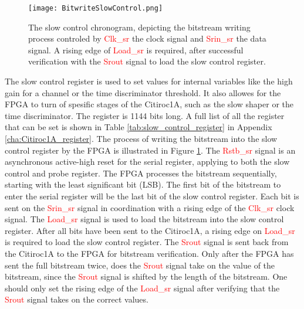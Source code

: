 \begin{figure}
    \centering
    \texttt{[image: BitwriteSlowControl.png]}
    \caption{The slow control chronogram, depicting the bitstream writing process controled by  \textcolor{red}{Clk\_sr} the clock signal and  \textcolor{red}{Srin\_sr} the data signal. A rising edge of \textcolor{red}{Load\_sr} is required,
     after successful verification with the \textcolor{red}{Srout} signal to load the slow control register.\autocite{datasheetCITIROC}}
    \label{fig:CITIROC1A_writing_bitstream}
\end{figure}
The slow control register is used to set values for internal variables like the high gain for a channel or the time discriminator threshold.
It also allowes for the FPGA to turn of spesific stages of the Citiroc1A, such as the slow shaper or the time discriminator.
The register is 1144 bits long. A full list of all the register that can be set is shown in Table \ref{tab:slow_control_register} in Appendix \ref{cha:Citiroc1A_register}.
\newline
The process of writing the bitstream into the slow control register by the FPGA is illustrated in Figure \ref{fig:CITIROC1A_writing_bitstream}.
\newline
The \textcolor{red}{Rstb\_sr} signal is an asynchronous active-high reset for the serial register, applying to both the slow control and probe register. 
\newline
The FPGA processes the bitstream sequentially, starting with the least significant bit (LSB).
The first bit of the bitstream to enter the serial register will be the last bit of the slow control register.
Each bit is sent on the \textcolor{red}{Srin\_sr} signal in coordination with a rising edge of the \textcolor{red}{Clk\_sr} clock signal.
\newline
The \textcolor{red}{Load\_sr} signal is used to load the bitstream into the slow control register. After all bits have been sent to the Citiroc1A,
a rising edge on \textcolor{red}{Load\_sr} is required to load the slow control register.
\newline
The \textcolor{red}{Srout} signal is sent back from the Citiroc1A to the FPGA for bitstream verification.
Only after the FPGA has sent the full bitstream twice, does the \textcolor{red}{Srout} signal take on the value of the bitstream, since the \textcolor{red}{Srout} signal is shifted by the length of the bitstream.\autocite{datasheetCITIROC}
One should only set the rising edge of the \textcolor{red}{Load\_sr} signal after verifying that the \textcolor{red}{Srout} signal takes on the correct values.

